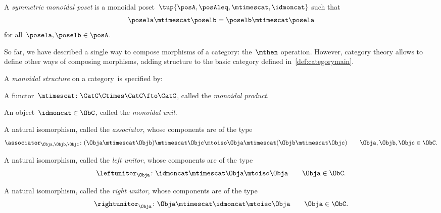 \begin{ctdefinition}
  \label{def:sym_monoidal_poset}
A \emph{symmetric monoidal poset} is a monoidal poset~$\tup{\posA, \posAleq, \mtimescat, \idmoncat}$ such that
\begin{equation*}
\posela \mtimescat \poselb = \poselb \mtimescat \posela
\end{equation*}
for all~$\posela, \poselb \in \posA$.
\end{ctdefinition}


So far, we have described a single way to compose morphisms of a category: the~$\mthen$ operation.
However, category theory allows to define other ways of composing morphisms, adding structure to the basic category defined in~\cref{def:categorymain}.


\begin{ctdefinition}
  \label{def:monoidal_cat}
  A \emph{monoidal structure} on a category~\CatC is specified by:
  
  \constit
  \begin{compactenum}
    \item A functor~$\mtimescat \colon \CatC \Ctimes \CatC\fto \CatC$, called the \emph{monoidal product}.
    \item An object~$\idmoncat \in \ObC$, called the \emph{monoidal unit}.
    \item A natural isomorphism, called the \emph{associator}, whose components are of the type
    \begin{equation*}
    \associator_{\Obja,\Objb,\Objc}\colon (\Obja \mtimescat \Objb )\mtimescat \Objc \mtoiso \Obja\mtimescat (\Objb \mtimescat \Objc) \quad \quad \Obja,\Objb,\Objc\in \ObC.
\end{equation*}
     \item A natural isomorphism, called the \emph{left unitor}, whose components are of the type
     \begin{equation*}
\leftunitor_\Obja \colon \idmoncat\mtimescat \Obja \mtoiso \Obja \quad \quad \Obja\in \ObC.
\end{equation*}
      \item A natural isomorphism, called the \emph{right unitor}, whose components are of the type
      \begin{equation*}
\rightunitor_\Obja \colon \Obja \mtimescat \idmoncat \mtoiso \Obja \quad \quad \Obja\in \ObC.
\end{equation*}
  \end{compactenum}
  

\end{ctdefinition}
